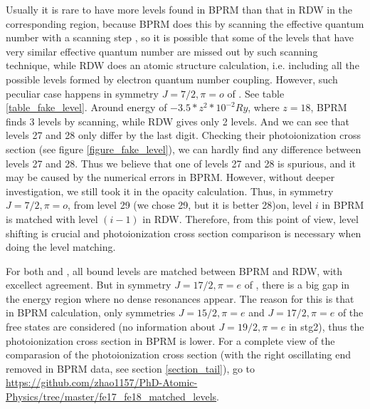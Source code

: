 Usually it is rare to have more levels found in BPRM than that in RDW in the corresponding region, because BPRM does this by scanning the effective quantum number with a scanning step \citep{seaton_bound_1985, berrington_seaton_1985}, so it is possible that some of the levels that have very similar effective quantum number are missed out by such scanning technique, while RDW does an atomic structure calculation, i.e. including all the possible levels formed by electron quantum number coupling. However, such peculiar case happens in symmetry $J = 7/2, \pi = o$ of . See table \ref{table_fake_level}. Around energy of $-3.5*z^2*10^{-2} Ry$, where $z=18$, BPRM finds 3 levels by scanning, while RDW gives only 2 levels. And we can see that levels 27 and 28 only differ by the last digit. Checking their photoionization cross section (see figure \ref{figure_fake_level}), we can hardly find any difference between levels 27 and 28. Thus we believe that one of levels 27 and 28 is spurious, and it may be caused by the numerical errors in BPRM. However, without deeper investigation, we still took it in the opacity calculation. Thus, in symmetry $J = 7/2, \pi = o$, from level 29 (we chose 29, but it is better 28)on, level $i$ in BPRM is matched with level $(i-1)$ in RDW. Therefore, from this point of view, level shifting is crucial and photoionization cross section comparison is necessary when doing the level matching. 

For both  and , all bound levels are matched between BPRM and RDW, with excellect agreement. But in symmetry $J = 17/2, \pi = e$ of , there is a big gap in the energy region where no dense resonances appear. The reason for this is that in BPRM calculation, only symmetries $J = 15/2, \pi = e$ and $J = 17/2, \pi = e$ of the free states are considered (no information about $J = 19/2, \pi = e$ in stg2), thus the photoionization cross section in BPRM is lower. For a complete view of the comparasion of the photoionization cross section (with the right oscillating end removed in BPRM data, see section \ref{section_tail}), go to \url{https://github.com/zhao1157/PhD-Atomic-Physics/tree/master/fe17_fe18_matched_levels}. 

